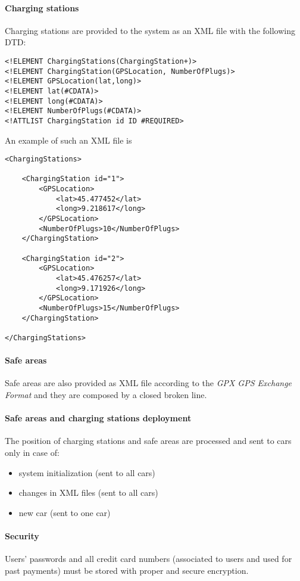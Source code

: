 \paragraph{Charging stations}Charging stations are provided to the system as an XML file with the following DTD:
\lstset{language=XML,frame=false}
\begin{lstlisting}
<!ELEMENT ChargingStations(ChargingStation+)>
<!ELEMENT ChargingStation(GPSLocation, NumberOfPlugs)>
<!ELEMENT GPSLocation(lat,long)>
<!ELEMENT lat(#CDATA)>
<!ELEMENT long(#CDATA)>
<!ELEMENT NumberOfPlugs(#CDATA)>
<!ATTLIST ChargingStation id ID #REQUIRED>
\end{lstlisting}
An example of such an XML file is 
\begin{lstlisting}
<ChargingStations>

	<ChargingStation id="1">
		<GPSLocation>
			<lat>45.477452</lat>
			<long>9.218617</long>
		</GPSLocation>
		<NumberOfPlugs>10</NumberOfPlugs>
	</ChargingStation>
	
	<ChargingStation id="2">
		<GPSLocation>
			<lat>45.476257</lat>
			<long>9.171926</long>
		</GPSLocation>
		<NumberOfPlugs>15</NumberOfPlugs>
	</ChargingStation>
	
</ChargingStations>
\end{lstlisting}

\paragraph{Safe areas}Safe areas are also provided as XML file according to the \emph{GPX GPS Exchange Format} \cite{gpx} and they are composed by a closed broken line.

\paragraph{Safe areas and charging stations deployment}The position of charging stations and safe areas are processed and sent to cars only in case of:
\begin{itemize}
	\item system initialization (sent to all cars)
	\item changes in XML files (sent to all cars)
	\item new car (sent to one car)
\end{itemize}

\paragraph{Security}Users' passwords and all credit card numbers (associated to users and used for past payments) must be stored with proper and secure encryption.

